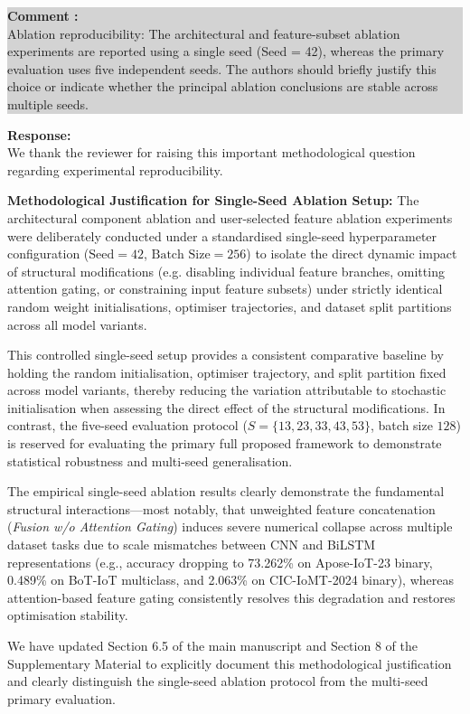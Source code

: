 \documentclass[11pt]{article}
\newcounter{commentcnt}
\newcommand{\question}[1]{
  \stepcounter{commentcnt}
  \vspace{1.5em}
  \noindent
  \colorbox{lightgray}{
    \parbox{\dimexpr\textwidth-2\fboxsep\relax}{
      \color{darkgreen}
      \textbf{Comment \thecommentcnt:} \\
      #1
    }
  }
  \vspace{0.5em}
}
\newcommand{\response}[1]{
  \noindent
  \textbf{Response:} \\
  #1
  \vspace{1.5em}
}
\begin{document}
\question{Ablation reproducibility: The architectural and feature-subset ablation experiments are reported using a single seed (Seed = 42), whereas the primary evaluation uses five independent seeds. The authors should briefly justify this choice or indicate whether the principal ablation conclusions are stable across multiple seeds.}

\response{We thank the reviewer for raising this important methodological question regarding experimental reproducibility.

\textbf{Methodological Justification for Single-Seed Ablation Setup:}
The architectural component ablation and user-selected feature ablation experiments were deliberately conducted under a standardised single-seed hyperparameter configuration ($\text{Seed} = 42$, $\text{Batch Size} = 256$) to isolate the direct dynamic impact of structural modifications (e.g. disabling individual feature branches, omitting attention gating, or constraining input feature subsets) under strictly identical random weight initialisations, optimiser trajectories, and dataset split partitions across all model variants.

This controlled single-seed setup provides a consistent comparative baseline by holding the random initialisation, optimiser trajectory, and split partition fixed across model variants, thereby reducing the variation attributable to stochastic initialisation when assessing the direct effect of the structural modifications. In contrast, the five-seed evaluation protocol ($S=\{13, 23, 33, 43, 53\}$, batch size $128$) is reserved for evaluating the primary full proposed framework to demonstrate statistical robustness and multi-seed generalisation.

The empirical single-seed ablation results clearly demonstrate the fundamental structural interactions—most notably, that unweighted feature concatenation (\textit{Fusion w/o Attention Gating}) induces severe numerical collapse across multiple dataset tasks due to scale mismatches between CNN and BiLSTM representations (e.g., accuracy dropping to 73.262\% on Apose-IoT-23 binary, 0.489\% on BoT-IoT multiclass, and 2.063\% on CIC-IoMT-2024 binary), whereas attention-based feature gating consistently resolves this degradation and restores optimisation stability.

We have updated Section 6.5 of the main manuscript and Section 8 of the Supplementary Material to explicitly document this methodological justification and clearly distinguish the single-seed ablation protocol from the multi-seed primary evaluation.

}
\end{document}
